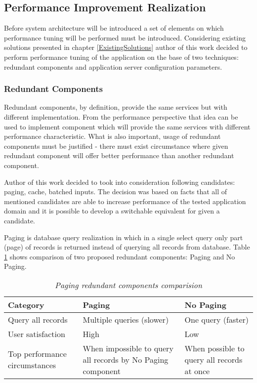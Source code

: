 \documentclass[10pt,a4paper]{article}
\begin{document}
\subsection{Performance Improvement Realization}

Before system architecture will be introduced a set of elements on which performance tuning will be performed must be introduced.  
Considering existing solutions presented in chapter \ref{ExistingSolutions} author of this work decided to perform performance tuning of the application on the base of two techniques: redundant components and application server configuration parameters. 

\subsubsection{Redundant Components}
Redundant components, by definition, provide the same services but with different implementation. From the performance perspective that idea can be used to implement component which will provide the same services with different performance characteristic. What is also important, usage of redundant components must be justified - there must exist circumstance where given redundant component will offer better performance than another redundant component. 

Author of this work decided to took into consideration following candidates: paging, cache, batched inputs. The decision was based on facts that all of mentioned candidates are able to increase performance of the  tested application domain and it is possible to develop a switchable equivalent for given a candidate. 

Paging is database query realization in which in a single select query only part (page) of records is returned instead of querying all records from database. Table \ref{pagingcomponents} shows comparison of two proposed redundant components: Paging and No Paging.  
\begin{table}[!htb]
\def\arraystretch{1.5}
\caption{\textit{Paging redundant components comparision}}\label{pagingcomponents}
\begin{tabularx}{\textwidth}{p{3cm}|X|X}
  \textbf{Category} &\textbf{Paging} & \textbf{No Paging} \\
\hline
Query all records & Multiple queries (slower) & One query (faster) \\
User satisfaction & High & Low\\
Top performance circumstances & When impossible to query all records by No Paging component & When possible to query all records at once\\
\end{tabularx}
\end{table}
\end{document}

